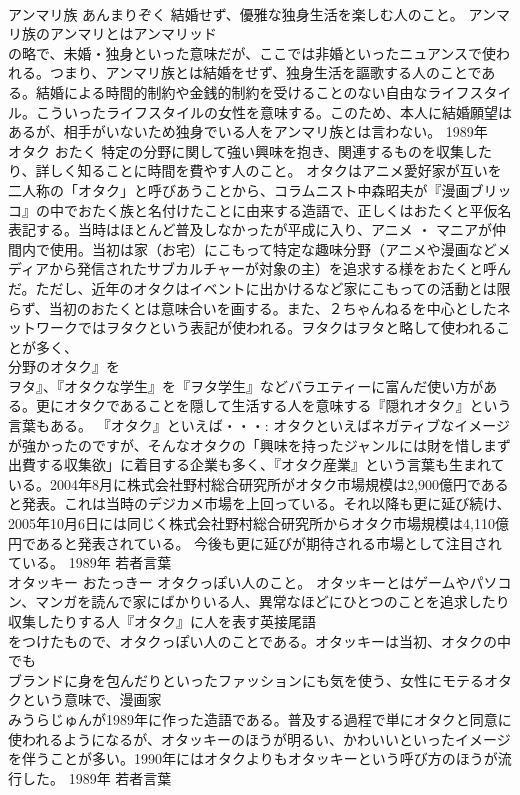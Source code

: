 \documentclass[8pt]{extreport}
\begin{document}
\begin{CJK}{UTF8}{min}
\\	アンマリ族	あんまりぞく	結婚せず、優雅な独身生活を楽しむ人のこと。	アンマリ族のアンマリとはアンマリッド
\\	の略で、未婚・独身といった意味だが、ここでは非婚といったニュアンスで使われる。つまり、アンマリ族とは結婚をせず、独身生活を謳歌する人のことである。結婚による時間的制約や金銭的制約を受けることのない自由なライフスタイル。こういったライフスタイルの女性を意味する。このため、本人に結婚願望はあるが、相手がいないため独身でいる人をアンマリ族とは言わない。	1989年	
\\	オタク	おたく	特定の分野に関して強い興味を抱き、関連するものを収集したり、詳しく知ることに時間を費やす人のこと。	オタクはアニメ愛好家が互いを二人称の「オタク」と呼びあうことから、コラムニスト中森昭夫が『漫画ブリッコ』の中でおたく族と名付けたことに由来する造語で、正しくはおたくと平仮名表記する。当時はほとんど普及しなかったが平成に入り、アニメ ・ マニアが仲間内で使用。当初は家（お宅）にこもって特定な趣味分野（アニメや漫画などメディアから発信されたサブカルチャーが対象の主）を追求する様をおたくと呼んだ。ただし、近年のオタクはイベントに出かけるなど家にこもっての活動とは限らず、当初のおたくとは意味合いを画する。また、２ちゃんねるを中心としたネットワークではヲタクという表記が使われる。ヲタクはヲタと略して使われることが多く、
\\	分野のオタク』を
\\	ヲタ』、『オタクな学生』を『ヲタ学生』などバラエティーに富んだ使い方がある。更にオタクであることを隠して生活する人を意味する『隠れオタク』という言葉もある。 『オタク』といえば・・・: オタクといえばネガティブなイメージが強かったのですが、そんなオタクの「興味を持ったジャンルには財を惜しまず出費する収集欲」に着目する企業も多く、『オタク産業』という言葉も生まれている。2004年8月に株式会社野村総合研究所がオタク市場規模は2,900億円であると発表。これは当時のデジカメ市場を上回っている。それ以降も更に延び続け、2005年10月6日には同じく株式会社野村総合研究所からオタク市場規模は4,110億円であると発表されている。 今後も更に延びが期待される市場として注目されている。	1989年	若者言葉	
\\	オタッキー	おたっきー	オタクっぽい人のこと。	オタッキーとはゲームやパソコン、マンガを読んで家にばかりいる人、異常なほどにひとつのことを追求したり収集したりする人『オタク』に人を表す英接尾語
\\	をつけたもので、オタクっぽい人のことである。オタッキーは当初、オタクの中でも
\\	ブランドに身を包んだりといったファッションにも気を使う、女性にモテるオタクという意味で、漫画家
\\	みうらじゅんが1989年に作った造語である。普及する過程で単にオタクと同意に使われるようになるが、オタッキーのほうが明るい、かわいいといったイメージを伴うことが多い。1990年にはオタクよりもオタッキーという呼び方のほうが流行した。	1989年	若者言葉	

\end{CJK}
\end{document}
